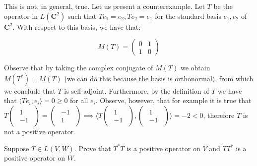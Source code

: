\begin{solution}

    This is not, in general, true. Let us present a counterexample. Let $T$ be the operator in $L(\mathbf{C}^2)$ such that $Te_1 = e_2, Te_2 = e_1$ for the standard basis $e_1, e_2$ of $\mathbf{C}^2$. With respect to this basis, we have that:

    $$M(T) = \begin{pmatrix}
        0 & 1 \\ 1 & 0
    \end{pmatrix}$$

    Observe that by taking the complex conjugate of $M(T)$ we obtain $M(T^*) = M(T)$ (we can do this because the basis is orthonormal), from which we conclude that $T$ is self-adjoint. Furthermore, by the definition  of $T$ we have that $\langle Te_i, e_i \rangle = 0 \geq 0$ for all $e_i$. Observe, however, that for example it is true that $T\begin{pmatrix} \begin{array} {r} 1 \\ -1 \end{array} \end{pmatrix} = \begin{pmatrix}
        \begin{array} {r} -1 \\ 1 \end{array} \end{pmatrix} \implies \langle T\begin{pmatrix} \begin{array} {r} 1 \\ -1 \end{array} \end{pmatrix}, \begin{pmatrix}
        \begin{array} {r} 1 \\ -1 \end{array} \end{pmatrix} \rangle = -2 < 0$, therefore $T$ is not a positive operator.
\end{solution}

\begin{exercise}{4}
    Suppose $T \in L(V, W)$. Prove that $T^*T$ is a positive operator on $V$ and $TT^*$ is a positive operator on $W$.
\end{exercise}

